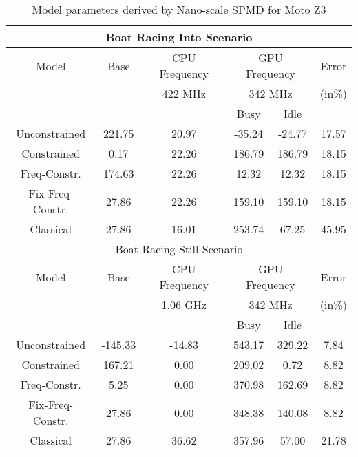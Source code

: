 \begin{table}[]
\caption{Model parameters derived by Nano-scale SPMD for Moto Z3}
\vspace{-0.1in}
{\footnotesize
\begin{tabular}{|c|c|c|c|c|c|}
    \hline
    \multicolumn{6}{|c|}{Boat Racing Into Scenario} \\
        \hline
        Model & Base & \multicolumn{1}{c|}{CPU Frequency} & \multicolumn{2}{c|}{GPU Frequency} & Error \\
        \cline{3-5}
        &  & 422 MHz & \multicolumn{2}{c|}{342 MHz} & (in\%) \\
        \cline{3-5}
                & & \multicolumn{1}{|c|}{} & Busy & Idle & \\
        \hline
        Unconstrained & 221.75 & 20.97 & -35.24 & -24.77 & 17.57 \\
        Constrained & 0.17 & 22.26 & 186.79 & 186.79 & 18.15 \\
        Freq-Constr. & 174.63 & 22.26 & 12.32 & 12.32 & 18.15 \\
        Fix-Freq-Constr. & 27.86 & 22.26 & 159.10 & 159.10 & 18.15 \\
        \hline
        Classical & 27.86 & 16.01 & 253.74 & 67.25 & 45.95 \\
        \hline

    \multicolumn{6}{|c|}{Boat Racing Still Scenario} \\
        \hline
        Model & Base & \multicolumn{1}{c|}{CPU Frequency} & \multicolumn{2}{c|}{GPU Frequency} & Error \\
        \cline{3-5}
        &  & 1.06 GHz & \multicolumn{2}{c|}{342 MHz} & (in\%) \\
        \cline{3-5}
                & & \multicolumn{1}{|c|}{} & Busy & Idle & \\
        \hline
        Unconstrained & -145.33 & -14.83 & 543.17 & 329.22 & 7.84 \\
        Constrained & 167.21 & 0.00 & 209.02 & 0.72 & 8.82 \\
        Freq-Constr. & 5.25 & 0.00 & 370.98 & 162.69 & 8.82 \\
        Fix-Freq-Constr. & 27.86 & 0.00 & 348.38 & 140.08 & 8.82 \\
        \hline
        Classical & 27.86 & 36.62 & 357.96 & 57.00 & 21.78 \\
        \hline


\end{tabular}}
\end{table}
